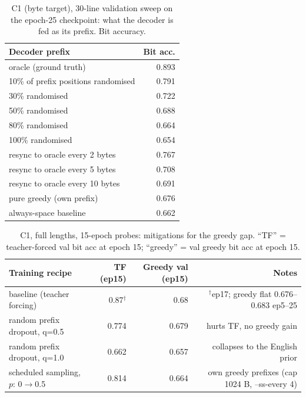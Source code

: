 \documentclass[11pt]{article}
\begin{document}
\begin{table}[h]
\centering
\caption{C1 (byte target), 30-line validation sweep on the epoch-25
checkpoint: what the decoder is fed as its prefix. Bit accuracy.}
\label{tab:prefix_sweep}
\begin{tabular}{lr}
\toprule
Decoder prefix & Bit acc. \\
\midrule
oracle (ground truth)                    & 0.893 \\
10\% of prefix positions randomised      & 0.791 \\
30\% randomised                          & 0.722 \\
50\% randomised                          & 0.688 \\
80\% randomised                          & 0.664 \\
100\% randomised                         & 0.654 \\
resync to oracle every 2 bytes           & 0.767 \\
resync to oracle every 5 bytes           & 0.708 \\
resync to oracle every 10 bytes          & 0.691 \\
pure greedy (own prefix)                 & 0.676 \\
always-space baseline                    & 0.662 \\
\bottomrule
\end{tabular}
\end{table}

\begin{table}[h]
\centering
\caption{C1, full lengths, 15-epoch probes: mitigations for the greedy gap.
``TF'' = teacher-forced val bit acc at epoch 15; ``greedy'' = val greedy bit
acc at epoch 15.}
\label{tab:fixes}
\begin{tabular}{lrrr}
\toprule
Training recipe & TF (ep15) & Greedy val (ep15) & Notes \\
\midrule
baseline (teacher forcing)     & ~0.87$^{\dagger}$ & ~0.68 & $^{\dagger}$ep17; greedy flat 0.676--0.683 ep5--25 \\
random prefix dropout, q=0.5   & 0.774 & 0.679 & hurts TF, no greedy gain \\
random prefix dropout, q=1.0   & 0.662 & 0.657 & collapses to the English prior \\
scheduled sampling, $p$: 0$\to$0.5 & 0.814 & 0.664 & own greedy prefixes (cap 1024 B, --ss-every 4) \\
\bottomrule
\end{tabular}
\end{table}
\end{document}
